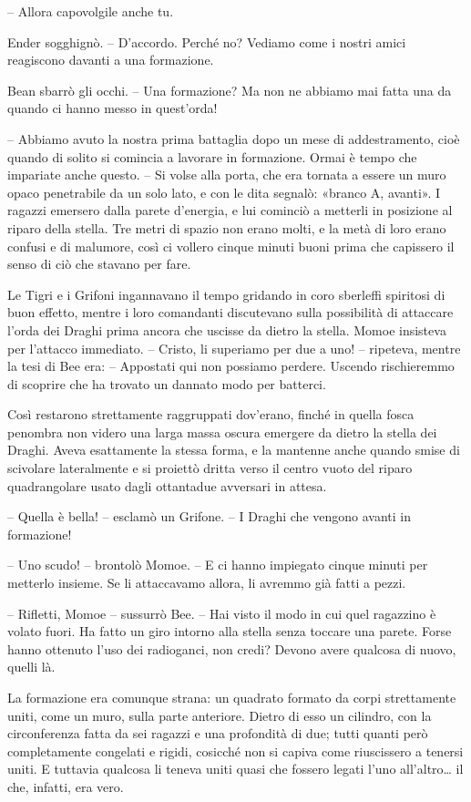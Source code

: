 {-- Allora capovolgile anche tu.}

{Ender sogghignò. -- D'accordo. Perché no? Vediamo come i nostri amici
	reagiscono davanti a una formazione.}

{Bean sbarrò gli occhi. -- Una formazione? Ma non ne abbiamo mai fatta
	una da quando ci hanno messo in quest'orda!}

{-- Abbiamo avuto la nostra prima battaglia dopo un mese di
	addestramento, cioè quando di solito si comincia a lavorare in
	formazione. Ormai è tempo che impariate anche questo. -- Si volse alla
	porta, che era tornata a essere un muro opaco penetrabile da un solo
	lato, e con le dita segnalò: «branco A, avanti». I ragazzi emersero
	dalla parete d'energia, e lui cominciò a metterli in posizione al riparo
	della stella. Tre metri di spazio non erano molti, e la metà di loro
	erano confusi e di malumore, così ci vollero cinque minuti buoni prima
	che capissero il senso di ciò che stavano per fare.}

{Le Tigri e i Grifoni ingannavano il tempo gridando in coro sberleffi
	spiritosi di buon effetto, mentre i loro comandanti discutevano sulla
	possibilità di attaccare l'orda dei Draghi prima ancora che uscisse da
	dietro la stella. Momoe insisteva per l'attacco immediato. -- Cristo, li
	superiamo per due a uno! -- ripeteva, mentre la tesi di Bee era: --
	Appostati qui non possiamo perdere. Uscendo rischieremmo di scoprire che
	ha trovato un dannato modo per batterci.}

{Così restarono strettamente raggruppati dov'erano, finché in quella
	fosca penombra non videro una larga massa oscura emergere da dietro la
	stella dei Draghi. Aveva esattamente la stessa forma, e la mantenne
	anche quando smise di scivolare lateralmente e si proiettò dritta verso
	il centro vuoto del riparo quadrangolare usato dagli ottantadue
	avversari in attesa.}

{-- Quella è bella! -- esclamò un Grifone. -- I Draghi che vengono
	avanti in formazione!}

{-- Uno scudo! -- brontolò Momoe. -- E ci hanno impiegato cinque minuti
	per metterlo insieme. Se li attaccavamo allora, li avremmo già fatti a
	pezzi.}

{-- Rifletti, Momoe -- sussurrò Bee. -- Hai visto il modo in cui quel
	ragazzino è volato fuori. Ha fatto un giro intorno alla stella senza
	toccare una parete. Forse hanno ottenuto l'uso dei radioganci, non
	credi? Devono avere qualcosa di nuovo, quelli là.}

{La formazione era comunque strana: un quadrato formato da corpi
	strettamente uniti, come un muro, sulla parte anteriore. Dietro di esso
	un cilindro, con la circonferenza fatta da sei ragazzi e una profondità
	di due; tutti quanti però completamente congelati e rigidi, cosicché non
	si capiva come riuscissero a tenersi uniti. E tuttavia qualcosa li
	teneva uniti quasi che fossero legati l'uno all'altro\ldots{} il che,
	infatti, era vero.}

